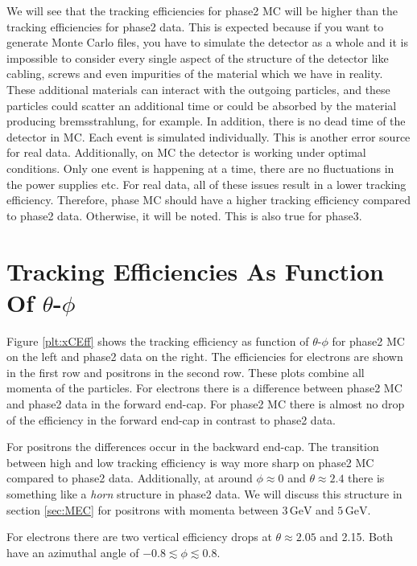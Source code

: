 \documentclass[a4paper,11pt,twosided,final,german,openbib,pdftex,listof=totoc,bibliography=totoc]{scrbook}
\begin{document}
We will see that the tracking efficiencies for phase2 MC will be higher than the tracking efficiencies for phase2 data. This is expected because if you want to generate Monte Carlo files, you have to simulate the detector as a whole and it is impossible to consider every single aspect of the structure of the detector like cabling, screws and even impurities of the material which we have in reality. These additional materials can interact with the outgoing particles, and these particles could scatter an additional time or could be absorbed by the material producing bremsstrahlung, for example. In addition, there is no dead time of the detector in MC. Each event is simulated individually. This is another error source for real data. Additionally, on MC the detector is working under optimal conditions. Only one event is happening at a time, there are no fluctuations in the power supplies etc.
For real data, all of these issues result in a lower tracking efficiency. Therefore, phase MC should have a higher tracking efficiency compared to phase2 data. Otherwise, it will be noted. This is also true for phase3.
 

\section{Tracking Efficiencies As Function Of $\theta$-$\phi$ }
\label{sec:tpEff}

Figure \ref{plt:xCEff} shows the tracking efficiency as function of $\theta$-$\phi$ for phase2 MC on the left and phase2 data on the right. The efficiencies for electrons are shown in the first row and positrons in the second row. These plots combine all momenta of the particles. For electrons there is a difference between phase2 MC and phase2 data in the forward end-cap. For phase2 MC there is almost no drop of the efficiency in the forward end-cap in contrast to phase2 data. 

For positrons the differences occur in the backward end-cap. The transition between high and low tracking efficiency is way more sharp on phase2 MC compared to phase2 data. Additionally, at around $\phi \approx 0$ and $\theta \approx 2.4$ there is something like a \textit{horn} structure in phase2 data. We will discuss this structure  in section \ref{sec:MEC} for positrons with momenta between $3\,\textrm{GeV}$ and $5\,\textrm{GeV}$.

For electrons there are two vertical efficiency drops at $\theta \approx 2.05$ and 2.15. Both have an azimuthal angle of $-0.8 \lesssim \phi \lesssim 0.8$.
\end{document}
